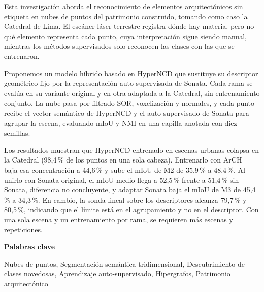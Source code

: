 
Esta investigación aborda el reconocimiento de elementos arquitectónicos sin
etiqueta en nubes de puntos del patrimonio construido, tomando como caso la
Catedral de Lima. El escáner láser terrestre registra dónde hay materia, pero no
qué elemento representa cada punto, cuya interpretación sigue siendo manual,
mientras los métodos supervisados solo reconocen las clases con las que se
entrenaron.

Proponemos un modelo híbrido basado en HyperNCD que sustituye su descriptor
geométrico fijo por la representación auto-supervisada de Sonata. Cada rama se
evalúa en su variante original y en otra adaptada a la Catedral, sin
entrenamiento conjunto. La nube pasa por filtrado SOR, voxelización y normales,
y cada punto recibe el vector semántico de HyperNCD y el auto-supervisado de
Sonata para agrupar la escena, evaluando mIoU y NMI en una capilla anotada con
diez semillas.

Los resultados muestran que HyperNCD entrenado en escenas urbanas colapsa en la
Catedral (98,4\,\% de los puntos en una sola cabeza). Entrenarlo con
ArCH~\cite{matrone2020benchmark} baja esa concentración a 44,6\,\% y sube el
mIoU de M2 de 35,9\,\% a 48,4\,\%. Al unirlo con Sonata original, el mIoU medio
llega a 52,5\,\% frente a 51,4\,\% sin Sonata, diferencia no concluyente, y
adaptar Sonata baja el mIoU de M3 de 45,4\,\% a 34,3\,\%. En cambio, la sonda
lineal sobre los descriptores alcanza 79,7\,\% y 80,5\,\%, indicando que el
límite está en el agrupamiento y no en el descriptor. Con una sola escena y un
entrenamiento por rama, se requieren más escenas y repeticiones.

\vspace{0.2em}

\noindent\begin{minipage}{\linewidth}
\noindent\textbf{Palabras clave}\par
\noindent Nubes de puntos, Segmentación semántica tridimensional, Descubrimiento
de clases novedosas, Aprendizaje auto-supervisado, Hipergrafos, Patrimonio
arquitectónico
\end{minipage}
